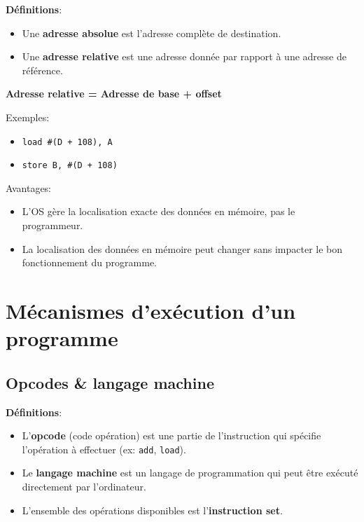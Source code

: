 \documentclass[a4paper]{article}
\begin{document}
\textbf{Définitions}:
\begin{itemize}
    \item Une \textbf{adresse absolue} est l'adresse complète de destination.
    \item Une \textbf{adresse relative} est une adresse donnée par rapport à une adresse de référence.
\end{itemize}

\begin{center}
    \textbf{Adresse relative = Adresse de base + offset}
\end{center}

\begin{example}
    Exemples:
    \begin{itemize}
        \item \texttt{load \#(D + 108), A}
        \item \texttt{store B, \#(D + 108)}
    \end{itemize}
\end{example}

Avantages:
\begin{itemize}
    \item L'OS gère la localisation exacte des données en mémoire, pas le programmeur.
    \item La localisation des données en mémoire peut changer sans impacter le bon fonctionnement du programme.
\end{itemize}










\section{Mécanismes d'exécution d'un programme}





\subsection{Opcodes \& langage machine}

\textbf{Définitions}:
\begin{itemize}
    \item L'\textbf{opcode} (code opération) est une partie de l'instruction qui spécifie l'opération à effectuer (ex: \texttt{add}, \texttt{load}).
    \item Le \textbf{langage machine} est un langage de programmation qui peut être exécuté directement par l'ordinateur.
    \item L'ensemble des opérations disponibles est l'\textbf{instruction set}.
\end{itemize}
\end{document}
